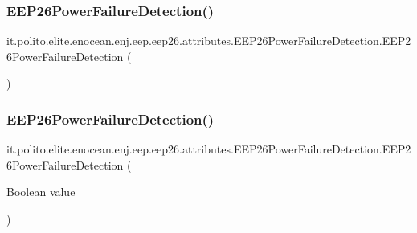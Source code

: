 \subsubsection{\texorpdfstring{E\+E\+P26\+Power\+Failure\+Detection()}{EEP26PowerFailureDetection()}\hspace{0.1cm}{\footnotesize\ttfamily [1/2]}}
{\footnotesize\ttfamily it.\+polito.\+elite.\+enocean.\+enj.\+eep.\+eep26.\+attributes.\+E\+E\+P26\+Power\+Failure\+Detection.\+E\+E\+P26\+Power\+Failure\+Detection (\begin{DoxyParamCaption}{ }\end{DoxyParamCaption})}

\hypertarget{classit_1_1polito_1_1elite_1_1enocean_1_1enj_1_1eep_1_1eep26_1_1attributes_1_1_e_e_p26_power_failure_detection_a0ae5d9ae2f7e8906b604e8f4c82f1dc8}{}\label{classit_1_1polito_1_1elite_1_1enocean_1_1enj_1_1eep_1_1eep26_1_1attributes_1_1_e_e_p26_power_failure_detection_a0ae5d9ae2f7e8906b604e8f4c82f1dc8} 
\subsubsection{\texorpdfstring{E\+E\+P26\+Power\+Failure\+Detection()}{EEP26PowerFailureDetection()}\hspace{0.1cm}{\footnotesize\ttfamily [2/2]}}
{\footnotesize\ttfamily it.\+polito.\+elite.\+enocean.\+enj.\+eep.\+eep26.\+attributes.\+E\+E\+P26\+Power\+Failure\+Detection.\+E\+E\+P26\+Power\+Failure\+Detection (\begin{DoxyParamCaption}\item[{Boolean}]{value }\end{DoxyParamCaption})}




